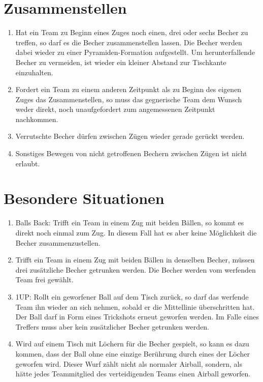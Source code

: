 \section{Zusammenstellen}
\begin{enumerate}[label={(\arabic*)}]
    \item
    Hat ein Team zu Beginn eines Zuges noch einen, drei oder sechs Becher zu treffen, so darf es die Becher zusammenstellen lassen.
    Die Becher werden dabei wieder zu einer Pyramiden-Formation aufgestellt.
    Um herunterfallende Becher zu vermeiden, ist wieder ein kleiner Abstand zur Tischkante einzuhalten.

    \item
    Fordert ein Team zu einem anderen Zeitpunkt als zu Beginn des eigenen Zuges das Zusammenstellen, so muss das gegnerische Team dem Wunsch weder direkt, noch unaufgefordert zum angemessenen Zeitpunkt nachkommen.

    \item
    Verrutschte Becher dürfen zwischen Zügen wieder gerade gerückt werden.

    \item
    Sonstiges Bewegen von nicht getroffenen Bechern zwischen Zügen ist nicht erlaubt.
\end{enumerate}

\section{Besondere Situationen}
\begin{enumerate}[label={(\arabic*)}]
    \item
    \glqq{}Balls Back\grqq{}: Trifft ein Team in einem Zug mit beiden Bällen, so kommt es direkt noch einmal zum Zug.
    In diesem Fall hat es aber keine Möglichkeit die Becher zusammenzustellen.

    \item
    Trifft ein Team in einem Zug mit beiden Bällen in denselben Becher, müssen drei zusätzliche Becher getrunken werden.
    Die Becher werden vom werfenden Team frei gewählt.

    \item
    \glqq{}1UP\grqq{}: Rollt ein geworfener Ball auf dem Tisch zurück, so darf das werfende Team ihn wieder an sich nehmen, sobald er die Mittellinie überschritten hat.
    Der Ball darf in Form eines Trickshots erneut geworfen werden.
    Im Falle eines Treffers muss aber kein zusätzlicher Becher getrunken werden.

    \item
    Wird auf einem Tisch mit Löchern für die Becher gespielt, so kann es dazu kommen, dass der Ball ohne eine einzige Berührung durch eines der Löcher geworfen wird.
    Dieser Wurf zählt nicht als normaler Airball, sondern, als hätte jedes Teammitglied des verteidigenden Teams einen Airball geworfen.
\end{enumerate}

